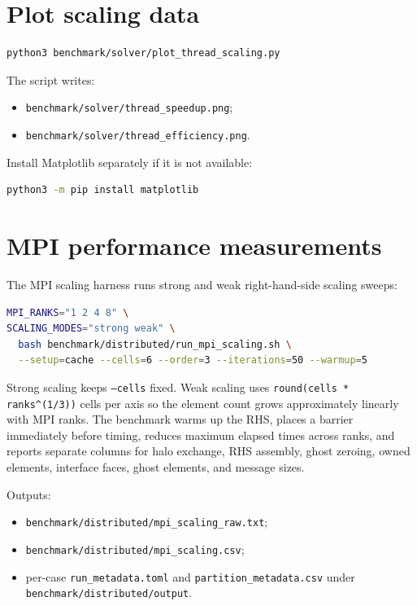 \documentclass[11pt,oneside]{book}
\newcommand{\code}[1]{\texttt{#1}}
\begin{document}
\section{Plot scaling data}

\begin{lstlisting}[language=bash]
python3 benchmark/solver/plot_thread_scaling.py
\end{lstlisting}

The script writes:

\begin{itemize}[leftmargin=*]
  \item \code{benchmark/solver/thread\_speedup.png};
  \item \code{benchmark/solver/thread\_efficiency.png}.
\end{itemize}

Install Matplotlib separately if it is not available:

\begin{lstlisting}[language=bash]
python3 -m pip install matplotlib
\end{lstlisting}

\section{MPI performance measurements}

The MPI scaling harness runs strong and weak right-hand-side scaling sweeps:

\begin{lstlisting}[language=bash]
MPI_RANKS="1 2 4 8" \
SCALING_MODES="strong weak" \
  bash benchmark/distributed/run_mpi_scaling.sh \
  --setup=cache --cells=6 --order=3 --iterations=50 --warmup=5
\end{lstlisting}

Strong scaling keeps \code{--cells} fixed. Weak scaling uses
\code{round(cells * ranks\textasciicircum{}(1/3))} cells per axis so the element count grows
approximately linearly with MPI ranks. The benchmark warms up the RHS, places a
barrier immediately before timing, reduces maximum elapsed times across ranks,
and reports separate columns for halo exchange, RHS assembly, ghost zeroing,
owned elements, interface faces, ghost elements, and message sizes.

Outputs:

\begin{itemize}[leftmargin=*]
  \item \code{benchmark/distributed/mpi\_scaling\_raw.txt};
  \item \code{benchmark/distributed/mpi\_scaling.csv};
  \item per-case \code{run\_metadata.toml} and
        \code{partition\_metadata.csv} under
        \code{benchmark/distributed/output}.
\end{itemize}
\end{document}

